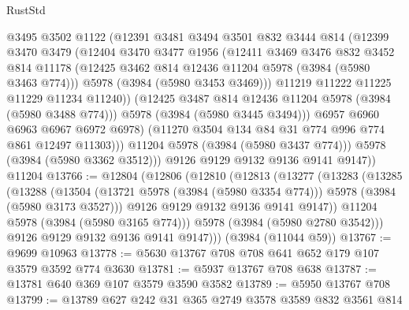 \begin{lexlean}{RustStd}
\begin{coremodule}
                  @3495
                  @3502
                  @1122
                  (@12391
                    @3481
                    @3494
                    @3501
                    @832
                    @3444
                    @814
                    (@12399
                      @3470
                      @3479
                      (@12404
                        @3470
                        @3477
                        @1956
                        (@12411
                          @3469
                          @3476
                          @832
                          @3452
                          @814
                          @11178
                          (@12425 @3462 @814 @12436 @11204 @5978 (@3984 (@5980 @3463 @774)))
                          @5978
                          (@3984 (@5980 @3453 @3469)))
                        @11219
                        @11222
                        @11225
                        @11229
                        @11234
                        @11240))
                    (@12425 @3487 @814 @12436 @11204 @5978 (@3984 (@5980 @3488 @774)))
                    @5978
                    (@3984 (@5980 @3445 @3494)))
                  @6957
                  @6960
                  @6963
                  @6967
                  @6972
                  @6978)
                (@11270 @3504 @134 @84 @31 @774 @996 @774 @861 @12497 @11303)))
            @11204
            @5978
            (@3984 (@5980 @3437 @774)))
          @5978
          (@3984 (@5980 @3362 @3512)))
        @9126
        @9129
        @9132
        @9136
        @9141
        @9147))
    @11204
@13766 := @12804
    (@12806
      (@12810
        (@12813
          (@13277
            (@13283
              (@13285
                (@13288
                  (@13504
                    (@13721 @5978 (@3984 (@5980 @3354 @774)))
                    @5978
                    (@3984 (@5980 @3173 @3527)))
                  @9126
                  @9129
                  @9132
                  @9136
                  @9141
                  @9147))
              @11204
              @5978
              (@3984 (@5980 @3165 @774)))
            @5978
            (@3984 (@5980 @2780 @3542)))
          @9126
          @9129
          @9132
          @9136
          @9141
          @9147)))
    (@3984 (@11044 @59))
@13767 := @9699 @10963
@13778 := @5630 @13767 @708 @708 @641 @652 @179 @107 @3579 @3592 @774 @3630
@13781 := @5937 @13767 @708 @638
@13787 := @13781 @640 @369 @107 @3579 @3590 @3582
@13789 := @5950 @13767 @708
@13799 := @13789 @627 @242 @31 @365 @2749 @3578 @3589 @832 @3561 @814

\end{coremodule}
\end{lexlean}
